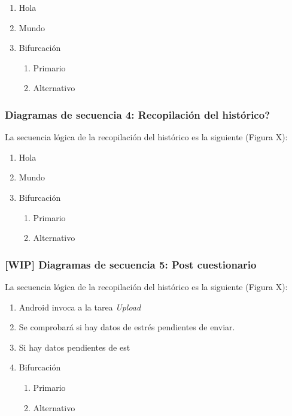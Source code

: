         \begin{enumerate}
            \item Hola
            \item Mundo
            \item Bifurcación
            \begin{enumerate}
                \item Primario
                \item Alternativo
            \end{enumerate}
        \end{enumerate}
        
    \subsubsection{Diagramas de secuencia 4: Recopilación del histórico?}
        La secuencia lógica de la recopilación del histórico es la siguiente (Figura X):

        \begin{enumerate}
            \item Hola
            \item Mundo
            \item Bifurcación
            \begin{enumerate}
                \item Primario
                \item Alternativo
            \end{enumerate}
        \end{enumerate}

    \subsubsection{[WIP] Diagramas de secuencia 5: Post cuestionario}
        La secuencia lógica de la recopilación del histórico es la siguiente (Figura X):

        \begin{enumerate}
            \item Android invoca a la tarea \textit{Upload}
            \item Se comprobará si hay datos de estrés pendientes de enviar.
            \item Si hay datos pendientes de est
            \item Bifurcación
            \begin{enumerate}
                \item Primario
                \item Alternativo
            \end{enumerate}
        \end{enumerate}

